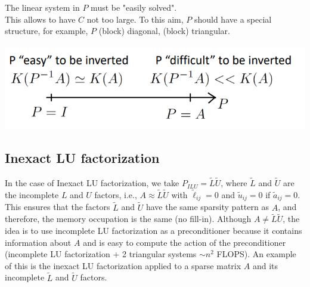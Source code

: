 \documentclass[11pt]{book}
\begin{document}
The linear system in $P$ must be "easily solved".\\
This allows to have $C$ not too large. To this aim, $P$ should have a special structure, for example, $P$ (block) diagonal, (block) triangular.\\ \\
\includegraphics[scale=0.7]{images/Arrow.png}


\subsection*{Inexact LU factorization}

In the case of Inexact LU factorization, we take $P_{ILU}=\widetilde{L} \widetilde{U}$, where $\widetilde{L}$ and $\widetilde{U}$ are the incomplete $L$ and $U$ factors, i.e., $A \approx \widetilde{L} \widetilde{U}$ with $\widetilde{\ell}_{ij}=0$ and $\widetilde{u}_{ij}=0$ if $\widetilde{a}_{ij}=0$. This ensures that the factors $\widetilde{L}$ and $\widetilde{U}$ have the same sparsity pattern as $A$, and therefore, the memory occupation is the same (no fill-in). Although $A \neq \widetilde{L} \widetilde{U}$, the idea is to use incomplete LU factorization as a preconditioner because it contains information about $A$ and is easy to compute the action of the preconditioner (incomplete LU factorization + 2 triangular systems $\sim n^2$ FLOPS). An example of this is the inexact LU factorization applied to a sparse matrix $A$ and its incomplete $\tilde{L}$ and $\tilde{U}$ factors.
\end{document}
